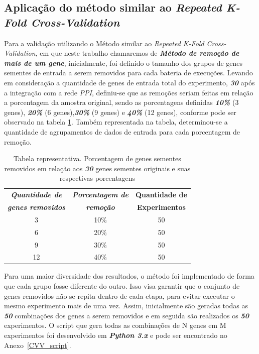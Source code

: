 \subsection{Aplicação do método similar ao \textsl{Repeated K-Fold Cross-Validation}}

Para a validação utilizando o Método similar ao \textsl{Repeated K-Fold Cross-Validation}, em que neste trabalho chamaremos de \textsl{\textbf{Método de remoção de mais de um gene}},
%
inicialmente, foi definido o tamanho dos grupos de genes sementes de entrada a serem removidos para cada bateria de execuções.
Levando em consideração a quantidade de genes de entrada total do experimento, \textsl{\textbf{30}} após a integração com a rede \textsl{PPI}, definiu-se que as remoções seriam feitas em relação a porcentagem da amostra original, sendo as porcentagens definidas \textbf{\textsl{10\%}} (3 genes), \textsl{\textbf{20\%}} (6 genes),\textsl{\textbf{30\%}} (9 genes) e \textsl{\textbf{40\%}} (12 genes), conforme pode ser observado na tabela \ref{table_gene_execucao}. Também representada na tabela, determinou-se a quantidade de agrupamentos de dados de entrada para cada porcentagem de remoção.

\begin{table}[]
\centering
\caption{Tabela representativa. Porcentagem de genes sementes removidos em relação aos \textsl{\textbf{30}} genes sementes originais e suas respectivas porcentagens}
\label{table_gene_execucao}
\begin{tabular}{@{}ccc@{}}
\toprule
\textbf{\textsl{Quantidade de}} & \textbf{\textsl{Porcentagem de}} & \textbf{Quantidade de} \\ 
\textbf{\textsl{genes removidos}} & \textbf{\textsl{remoção}} & \textbf{Experimentos} \\ \midrule
3 & 10\% & 50 \\
6 & 20\% & 50 \\
9 & 30\% & 50 \\
12& 40\% & 50 \\ \bottomrule
\end{tabular}
\end{table}

Para uma maior diversidade dos resultados, o método foi implementado de forma que cada grupo fosse diferente do outro.
%
Isso visa garantir que o conjunto de genes removidos não se repita dentro de cada etapa, para evitar executar o mesmo experimento mais de uma vez.
Assim, inicialmente são geradas todas as \textsl{\textbf{50}} combinações dos genes a serem removidos e em seguida são realizados os \textsl{\textbf{50}} experimentos.
%
O script que gera todas as combinações de N genes em M experimentos foi desenvolvido em \textsl{\textbf{Python 3.x}} e pode ser encontrado no Anexo~\ref{CVV_script}.


